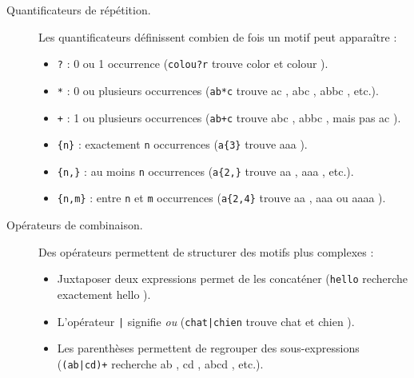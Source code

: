\documentclass[correction]{td}
\begin{document}
\begin{description}
  \item[Quantificateurs de répétition.] Les quantificateurs définissent combien de fois un motif peut apparaître :
    \begin{itemize}
    \item \lstinline{?} : 0 ou 1 occurrence (\lstinline{colou?r} trouve \og color \fg{} et \og colour \fg).
    \item \lstinline{*} : 0 ou plusieurs occurrences (\lstinline{ab*c} trouve \og ac \fg, \og abc \fg, \og abbc \fg, etc.).
    \item \lstinline{+} : 1 ou plusieurs occurrences (\lstinline{ab+c} trouve \og abc \fg, \og abbc \fg, mais pas \og ac \fg).
    \item \lstinline|{n}| : exactement \lstinline{n} occurrences (\lstinline|a{3}| trouve \og aaa \fg).
    \item \lstinline|{n,}| : au moins \lstinline{n} occurrences (\lstinline|a{2,}| trouve \og aa \fg, \og aaa \fg, etc.).
    \item \lstinline|{n,m}| : entre \lstinline{n} et \lstinline{m} occurrences (\lstinline|a{2,4}| trouve \og aa \fg, \og aaa \fg{} ou \og aaaa \fg).
    \end{itemize}

  \item[Opérateurs de combinaison.] Des opérateurs permettent de structurer des motifs plus complexes :
    \begin{itemize}
    \item Juxtaposer deux expressions permet de les concaténer (\lstinline{hello} recherche exactement \og hello \fg).
    \item L'opérateur \lstinline{|} signifie \emph{ou} (\lstinline{chat|chien} trouve \og chat \fg{} et \og chien \fg).
    \item Les parenthèses permettent de regrouper des sous-expressions (\lstinline{(ab|cd)+} recherche \og ab \fg, \og cd \fg, \og abcd \fg, etc.).
    \end{itemize}
\end{description}
\end{document}
